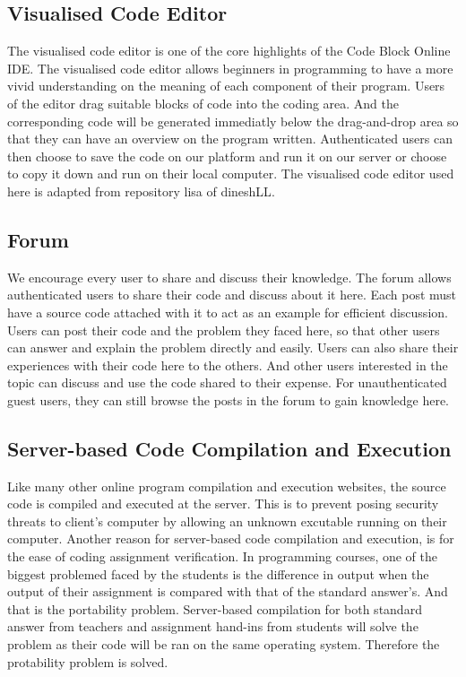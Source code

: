 \subsection{Visualised Code Editor}
The visualised code editor is one of the core highlights of the Code Block Online IDE. The visualised code editor allows beginners in programming to have a more vivid understanding on the meaning of each component of their program. Users of the editor drag suitable blocks of code into the coding area. And the corresponding code will be generated immediatly below the drag-and-drop area so that they can have an overview on the program written. Authenticated users can then choose to save the code on our platform and run it on our server or choose to copy it down and run on their local computer. The visualised code editor used here is adapted from repository lisa of dineshLL\cite{lisa}.

\subsection{Forum}
We encourage every user to share and discuss their knowledge. The forum allows authenticated users to share their code and discuss about it here. Each post must have a source code attached with it to act as an example for efficient discussion. Users can post their code and the problem they faced here, so that other users can answer and explain the problem directly and easily. Users can also share their experiences with their code here to the others. And other users interested in the topic can discuss and use the code shared to their expense. For unauthenticated guest users, they can still browse the posts in the forum to gain knowledge here.

\subsection{Server-based Code Compilation and Execution}
Like many other online program compilation and execution websites, the source code is compiled and executed at the server. This is to prevent posing security threats to client's computer by allowing an unknown excutable running on their computer. Another reason for server-based code compilation and execution, is for the ease of coding assignment verification. In programming courses, one of the biggest problemed faced by the students is the difference in output when the output of their assignment is compared with that of the standard answer's. And that is the portability problem. Server-based compilation for both standard answer from teachers and assignment hand-ins from students will solve the problem as their code will be ran on the same operating system. Therefore the protability problem is solved.

